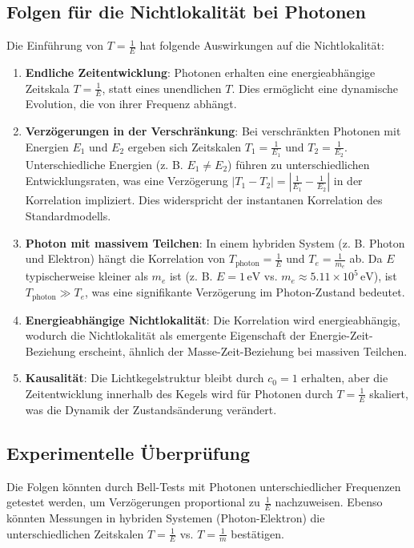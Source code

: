 \documentclass[a4paper,12pt]{article}
\begin{document}
	\subsection{Folgen für die Nichtlokalität bei Photonen}
	Die Einführung von \( T = \frac{1}{E} \) hat folgende Auswirkungen auf die Nichtlokalität:
	
	\begin{enumerate}
		\item \textbf{Endliche Zeitentwicklung}: Photonen erhalten eine energieabhängige Zeitskala \( T = \frac{1}{E} \), statt eines unendlichen \( T \). Dies ermöglicht eine dynamische Evolution, die von ihrer Frequenz abhängt.
		
		\item \textbf{Verzögerungen in der Verschränkung}: Bei verschränkten Photonen mit Energien \( E_1 \) und \( E_2 \) ergeben sich Zeitskalen \( T_1 = \frac{1}{E_1} \) und \( T_2 = \frac{1}{E_2} \). Unterschiedliche Energien (z. B. \( E_1 \neq E_2 \)) führen zu unterschiedlichen Entwicklungsraten, was eine Verzögerung \( |T_1 - T_2| = \left| \frac{1}{E_1} - \frac{1}{E_2} \right| \) in der Korrelation impliziert. Dies widerspricht der instantanen Korrelation des Standardmodells.
		
		\item \textbf{Photon mit massivem Teilchen}: In einem hybriden System (z. B. Photon und Elektron) hängt die Korrelation von \( T_\text{photon} = \frac{1}{E} \) und \( T_e = \frac{1}{m_e} \) ab. Da \( E \) typischerweise kleiner als \( m_e \) ist (z. B. \( E = 1 \, \text{eV} \) vs. \( m_e \approx 5.11 \times 10^5 \, \text{eV} \)), ist \( T_\text{photon} \gg T_e \), was eine signifikante Verzögerung im Photon-Zustand bedeutet.
		
		\item \textbf{Energieabhängige Nichtlokalität}: Die Korrelation wird energieabhängig, wodurch die Nichtlokalität als emergente Eigenschaft der Energie-Zeit-Beziehung erscheint, ähnlich der Masse-Zeit-Beziehung bei massiven Teilchen.
		
		\item \textbf{Kausalität}: Die Lichtkegelstruktur bleibt durch \( c_0 = 1 \) erhalten, aber die Zeitentwicklung innerhalb des Kegels wird für Photonen durch \( T = \frac{1}{E} \) skaliert, was die Dynamik der Zustandsänderung verändert.
	\end{enumerate}
	
	\subsection{Experimentelle Überprüfung}
	Die Folgen könnten durch Bell-Tests mit Photonen unterschiedlicher Frequenzen getestet werden, um Verzögerungen proportional zu \( \frac{1}{E} \) nachzuweisen. Ebenso könnten Messungen in hybriden Systemen (Photon-Elektron) die unterschiedlichen Zeitskalen \( T = \frac{1}{E} \) vs. \( T = \frac{1}{m} \) bestätigen.
	
\end{document}
